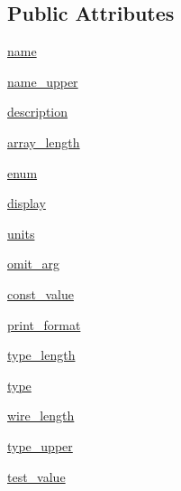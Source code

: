 \subsection*{Public Attributes}
\begin{DoxyCompactItemize}
\item 
\mbox{\hyperlink{classpymavlink_1_1generator_1_1mavparse_1_1MAVField_ad636436d0d81c4e54194aaf5c24ace5e}{name}}
\item 
\mbox{\hyperlink{classpymavlink_1_1generator_1_1mavparse_1_1MAVField_a1f731aa53adc75074de25ab5b2fb2c19}{name\+\_\+upper}}
\item 
\mbox{\hyperlink{classpymavlink_1_1generator_1_1mavparse_1_1MAVField_a2f5084d72c4c52a93d65742e73a83557}{description}}
\item 
\mbox{\hyperlink{classpymavlink_1_1generator_1_1mavparse_1_1MAVField_a45f6fb514dad3baeec4adf06f7eadff8}{array\+\_\+length}}
\item 
\mbox{\hyperlink{classpymavlink_1_1generator_1_1mavparse_1_1MAVField_ad3e270468f22ebea9a3f2e6150ac42b5}{enum}}
\item 
\mbox{\hyperlink{classpymavlink_1_1generator_1_1mavparse_1_1MAVField_a216925a287f997c02ed5b4afdf686a62}{display}}
\item 
\mbox{\hyperlink{classpymavlink_1_1generator_1_1mavparse_1_1MAVField_a945c22c5e49d09b90217c28f23825e6a}{units}}
\item 
\mbox{\hyperlink{classpymavlink_1_1generator_1_1mavparse_1_1MAVField_a97cadc8e5dd4dd565db04252a1acc57a}{omit\+\_\+arg}}
\item 
\mbox{\hyperlink{classpymavlink_1_1generator_1_1mavparse_1_1MAVField_a88016d3963914ae218ccb9660e0d46ee}{const\+\_\+value}}
\item 
\mbox{\hyperlink{classpymavlink_1_1generator_1_1mavparse_1_1MAVField_a8edb675a1e308a85270a3f1fe13022c1}{print\+\_\+format}}
\item 
\mbox{\hyperlink{classpymavlink_1_1generator_1_1mavparse_1_1MAVField_ac008d9e1549468450b3492741fba7ada}{type\+\_\+length}}
\item 
\mbox{\hyperlink{classpymavlink_1_1generator_1_1mavparse_1_1MAVField_aaa2d333fb1da3b04d3ffae7122f4205b}{type}}
\item 
\mbox{\hyperlink{classpymavlink_1_1generator_1_1mavparse_1_1MAVField_abddf1790763e5a2e23ab8b5ff2960fa2}{wire\+\_\+length}}
\item 
\mbox{\hyperlink{classpymavlink_1_1generator_1_1mavparse_1_1MAVField_afc6dd91e20147444311c9372c78cb353}{type\+\_\+upper}}
\item 
\mbox{\hyperlink{classpymavlink_1_1generator_1_1mavparse_1_1MAVField_a063f426c6c78fcabcefab9a5453f0e89}{test\+\_\+value}}
\end{DoxyCompactItemize}


